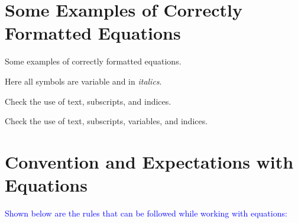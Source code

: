 \documentclass[phd]{ndsu-thesis-2022}
\newcommand\italk[1]{\textcolor{blue}{#1}}  %
\begin{document}
\section{Some Examples of Correctly Formatted Equations}

Some examples of correctly formatted equations. 


Here all symbols are variable and in \textit{italics}.


Check the use of text, subscripts, and indices. 


Check the use of text, subscripts, variables, and indices. 


\section{Convention and Expectations with Equations}

\italk{Shown below are the rules that can be followed while working with equations:}
\end{document}
